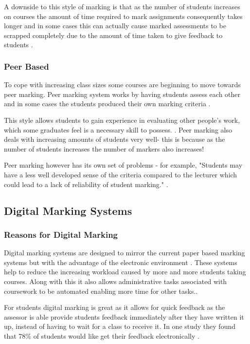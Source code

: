 \documentclass[12pt]{article}  %
\begin{document}
A downside to this style of marking is that as the number of students increases on courses the amount of time required to mark assignments consequently takes longer and in some cases this can actually cause marked assessments to be scrapped completely due to the amount of time taken to give feedback to students \cite{brown_assessment_1999}.


\subsubsection{Peer Based}
To cope with increasing class sizes some courses are beginning to move towards peer marking. Peer marking system works by having students assess each other and in some cases  the students produced their own marking criteria \cite{orsmond_use_2000}.

This style allows  students to gain experience in evaluating other people's work, which some graduates feel is a necessary skill to possess. \cite{langan_insights_nodate}. Peer marking also deals with increasing amounts of students very well- this is because as the number of students increases the number of markers also increases!

Peer marking however has its own set of problems - for example, "Students may have a less well developed sense of the criteria compared to the lecturer which could lead to a lack of reliability of student marking." \cite{orsmond_use_2000}.



\subsection{Digital Marking Systems}

\subsubsection{Reasons for Digital Marking}
Digital marking systems are designed to mirror the current paper based marking systems but with the advantage of the electronic environment \cite{heinrich_online_2003}. These systems help to reduce the increasing workload caused by more and more students taking courses. Along with this it also allows administrative tasks associated with coursework to be automated enabling more time for other tasks.\cite{joy_effective_1998}.

For students digital marking is great as it allows for quick feedback as the assessor is able provide students feedback immediately after they have written it up, instead of having to wait for a class to receive it. In one study\cite{dahl_turnitin_2007} they found that 78\% of students would like get their feedback  electronically .
\end{document}
